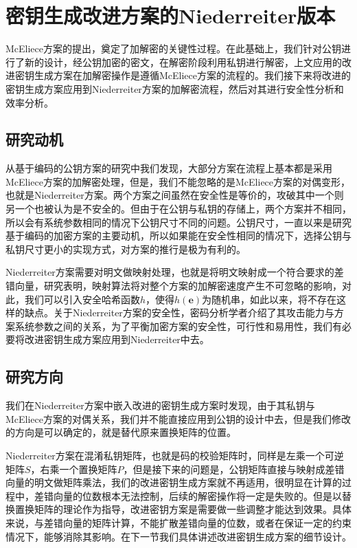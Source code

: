 \chapter{密钥生成改进方案的Niederreiter版本}
McEliece方案的提出，奠定了加解密的关键性过程。在此基础上，我们针对公钥进行了新的设计，经公钥加密的密文，在解密阶段利用私钥进行解密，上文应用的改进密钥生成方案在加解密操作是遵循McEliece方案的流程的。我们接下来将改进的密钥生成方案应用到Niederreiter方案的加解密流程，然后对其进行安全性分析和效率分析。

\section{研究动机}
从基于编码的公钥方案的研究中我们发现，大部分方案在流程上基本都是采用McEliece方案的加解密处理，但是，我们不能忽略的是McEliece方案的对偶变形，也就是Niederreiter方案。两个方案之间虽然在安全性是等价的，攻破其中一个则另一个也被认为是不安全的。但由于在公钥与私钥的存储上，两个方案并不相同，所以会有系统参数相同的情况下公钥尺寸不同的问题。公钥尺寸，一直以来是研究基于编码的加密方案的主要动机，所以如果能在安全性相同的情况下，选择公钥与私钥尺寸更小的实现方式，对方案的推行是极为有利的。

Niederreiter方案需要对明文做映射处理，也就是将明文映射成一个符合要求的差错向量，研究表明，映射算法将对整个方案的加解密速度产生不可忽略的影响，对此，我们可以引入安全哈希函数$h$，使得$h(\mathbf{e})$为随机串，如此以来，将不存在这样的缺点。关于Niederreiter方案的安全性，密码分析学者介绍了其攻击能力与方案系统参数之间的关系，为了平衡加密方案的安全性，可行性和易用性，我们有必要将改进密钥生成方案应用到Niederreiter中去。

\section{研究方向}
我们在Niederreiter方案中嵌入改进的密钥生成方案时发现，由于其私钥与McEliece方案的对偶关系，我们并不能直接应用到公钥的设计中去，但是我们修改的方向是可以确定的，就是替代原来置换矩阵的位置。

Niederreiter方案在混淆私钥矩阵，也就是码的校验矩阵时，同样是左乘一个可逆矩阵$S$，右乘一个置换矩阵$P$，但是接下来的问题是，公钥矩阵直接与映射成差错向量的明文做矩阵乘法，我们的改进密钥生成方案就不再适用，很明显在计算的过程中，差错向量的位数根本无法控制，后续的解密操作将一定是失败的。但是以替换置换矩阵的理论作为指导，改进密钥方案是需要做一些调整才能达到效果。具体来说，与差错向量的矩阵计算，不能扩散差错向量的位数，或者在保证一定的约束情况下，能够消除其影响。在下一节我们具体讲述改进密钥生成方案的细节设计。

